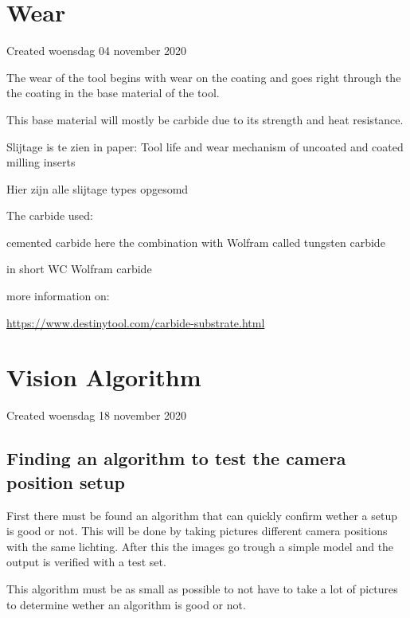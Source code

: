 \documentclass{article}
\begin{document}
		\section{Wear}

Created woensdag 04 november 2020



The wear of the tool begins with wear on the coating and goes right through the the coating in the base material of the tool. 

This base material will mostly be carbide due to its strength and heat resistance. 

	Slijtage is te zien in paper: Tool life and wear mechanism of uncoated and coated milling inserts
	
	Hier zijn alle slijtage types opgesomd
	
	

	The carbide used:
	
		cemented carbide here the combination with Wolfram called tungsten carbide
		
		in short WC Wolfram carbide
		
		

		more information on:
		
			\href{https://www.destinytool.com/carbide-substrate.html}{https://www.destinytool.com/carbide-substrate.html}
			
			



	






		\section{Vision Algorithm}

Created woensdag 18 november 2020



\subsection{Finding an algorithm to test the camera position setup}

First there must be found an algorithm that can quickly confirm wether a setup is good or not. This will be done by taking pictures different camera positions with the same lichting. After this the images go trough a simple model and the output is verified with a test set. 

This algorithm must be as small as possible to not have to take a lot of pictures to determine wether an algorithm is good or not. 
\end{document}
